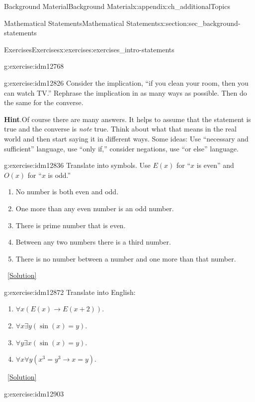 \documentclass[oneside,10pt,]{book}
\numberwithin{equation}{chapter}
\def\imp{\rightarrow}
\begin{document}
\begin{appendixptx}{Background Material}{}{Background Material}{}{}{x:appendix:ch_additionalTopics}
\begin{sectionptx}{Mathematical Statements}{}{Mathematical Statements}{}{}{x:section:sec_background-statements}
\begin{exercises-subsection}{Exercises}{}{Exercises}{}{}{x:exercises:exercises_intro-statements}
\begin{divisionexercise}{5}{}{}{g:exercise:idm12768}
\begin{enumerate}[label=(\alph*)]
\end{enumerate}
\end{divisionexercise}%
\begin{divisionexercise}{6}{}{}{g:exercise:idm12826}%
Consider the implication, ``if you clean your room, then you can watch TV.'' Rephrase the implication in as many ways as possible. Then do the same for the converse.%
\par\smallskip%
\noindent\textbf{Hint}.\hypertarget{g:hint:idm12830}{}\quad{}Of course there are many answers. It helps to assume that the statement is true and the converse is \emph{note} true. Think about what that means in the real world and then start saying it in different ways. Some ideas: Use ``necessary and sufficient'' language, use ``only if,'' consider negations, use ``or else'' language.%
\end{divisionexercise}%
\begin{divisionexercise}{7}{}{}{g:exercise:idm12836}%
Translate into symbols. Use \(E(x)\) for ``\(x\) is even'' and \(O(x)\) for ``\(x\) is odd.''%
%
\begin{enumerate}[label=(\alph*)]
\item{}No number is both even and odd.%
\item{}One more than any even number is an odd number.%
\item{}There is prime number that is even.%
\item{}Between any two numbers there is a third number.%
\item{}There is no number between a number and one more than that number.%
\end{enumerate}
\qquad~\hfill{\tiny\hyperlink{g:solution:idm12856-main}{[Solution]}}\end{divisionexercise}%
\begin{divisionexercise}{8}{}{}{g:exercise:idm12872}%
Translate into English:%
\begin{enumerate}[label=(\alph*)]
\item{}\(\forall x (E(x) \imp E(x +2))\).%
\item{}\(\forall x \exists y (\sin(x) = y)\).%
\item{}\(\forall y \exists x (\sin(x) = y)\).%
\item{}\(\forall x \forall y (x^3 = y^3 \imp x = y)\).%
\end{enumerate}
%
\qquad~\hfill{\tiny\hyperlink{g:solution:idm12884-main}{[Solution]}}\end{divisionexercise}%
\begin{divisionexercise}{9}{}{}{g:exercise:idm12903}%

\end{divisionexercise}
\end{exercises-subsection}
\end{sectionptx}
\end{appendixptx}
\end{document}
